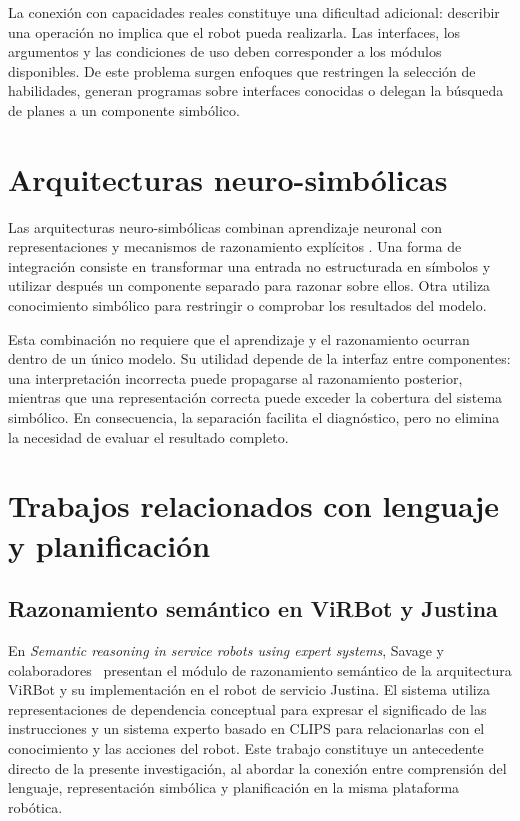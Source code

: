 La conexión con capacidades reales constituye una dificultad adicional: describir una operación no implica que el robot pueda realizarla. Las interfaces, los argumentos y las condiciones de uso deben corresponder a los módulos disponibles. De este problema surgen enfoques que restringen la selección de habilidades, generan programas sobre interfaces conocidas o delegan la búsqueda de planes a un componente simbólico.

\section{Arquitecturas neuro-simbólicas}

Las arquitecturas neuro-simbólicas combinan aprendizaje neuronal con representaciones y mecanismos de razonamiento explícitos \cite{garcez2015neural,besold2017neural}. Una forma de integración consiste en transformar una entrada no estructurada en símbolos y utilizar después un componente separado para razonar sobre ellos. Otra utiliza conocimiento simbólico para restringir o comprobar los resultados del modelo.

Esta combinación no requiere que el aprendizaje y el razonamiento ocurran dentro de un único modelo. Su utilidad depende de la interfaz entre componentes: una interpretación incorrecta puede propagarse al razonamiento posterior, mientras que una representación correcta puede exceder la cobertura del sistema simbólico. En consecuencia, la separación facilita el diagnóstico, pero no elimina la necesidad de evaluar el resultado completo.

\section{Trabajos relacionados con lenguaje y planificación}

\subsection{Razonamiento semántico en ViRBot y Justina}

En \textit{Semantic reasoning in service robots using expert systems}, Savage y colaboradores~\cite{savage2019semantic} presentan el módulo de razonamiento semántico de la arquitectura ViRBot y su implementación en el robot de servicio Justina. El sistema utiliza representaciones de dependencia conceptual para expresar el significado de las instrucciones y un sistema experto basado en CLIPS para relacionarlas con el conocimiento y las acciones del robot. Este trabajo constituye un antecedente directo de la presente investigación, al abordar la conexión entre comprensión del lenguaje, representación simbólica y planificación en la misma plataforma robótica.

